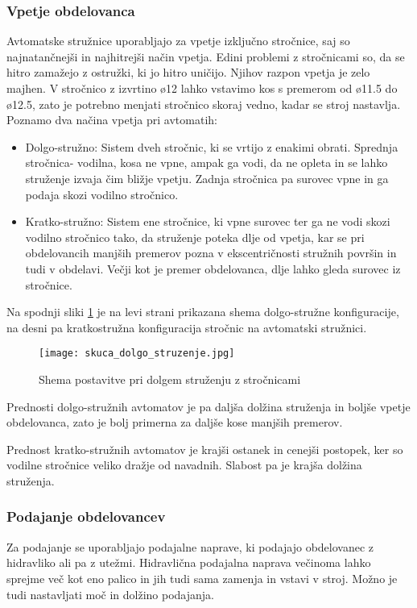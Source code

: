 \subsubsection{Vpetje obdelovanca}
Avtomatske stružnice uporabljajo za vpetje izključno stročnice, 
saj so najnatančnejši in najhitrejši način vpetja. Edini problemi 
z stročnicami so, da se hitro zamažejo z ostružki, ki jo hitro 
uničijo. Njihov razpon vpetja je zelo majhen. V stročnico z 
izvrtino ø12 lahko vstavimo kos s premerom od ø11.5 do ø12.5, 
zato je potrebno menjati stročnico skoraj vedno, kadar se stroj nastavlja.
Poznamo dva načina vpetja pri avtomatih:
\begin{itemize}
    \item Dolgo-stružno: Sistem dveh stročnic, ki se vrtijo z 
    enakimi obrati. Sprednja stročnica- vodilna, kosa ne vpne, 
    ampak ga vodi, da ne opleta in se lahko struženje izvaja čim 
    bližje vpetju. Zadnja stročnica pa surovec vpne in ga podaja 
    skozi vodilno stročnico.
    \item Kratko-stružno: Sistem ene stročnice, ki vpne surovec
    ter ga ne vodi skozi vodilno stročnico tako, da struženje 
    poteka dlje od vpetja, kar se pri obdelovancih manjših 
    premerov pozna v ekscentričnosti stružnih površin in tudi v obdelavi.
    Večji kot je premer obdelovanca, dlje lahko gleda surovec iz stročnice.
\end{itemize}

Na spodnji sliki \ref{tipi_vodilnih_pus} je na levi strani prikazana
shema dolgo-stružne konfiguracije, na desni pa kratkostružna konfiguracija
stročnic na avtomatski stružnici.

\begin{figure}[H]
    \begin{center}
        \texttt{[image: skuca\_dolgo\_struzenje.jpg]}       
        \caption{Shema postavitve pri dolgem struženju z stročnicami
                \cite{interna}}
        \label{tipi_vodilnih_pus}
    \end{center}
\end{figure}

Prednosti dolgo-stružnih avtomatov je pa daljša dolžina struženja 
in boljše vpetje obdelovanca, zato je bolj primerna za daljše 
kose manjših premerov.

Prednost kratko-stružnih avtomatov je krajši ostanek in cenejši 
postopek, ker so vodilne stročnice veliko dražje od navadnih. 
Slabost pa je krajša dolžina struženja.

\subsubsection{Podajanje obdelovancev}
Za podajanje se uporabljajo podajalne naprave, ki podajajo 
obdelovanec z hidravliko ali pa z utežmi. Hidravlična podajalna 
naprava večinoma lahko sprejme več kot eno palico in jih tudi sama 
zamenja in vstavi v stroj. Možno je tudi nastavljati moč in dolžino
podajanja.

